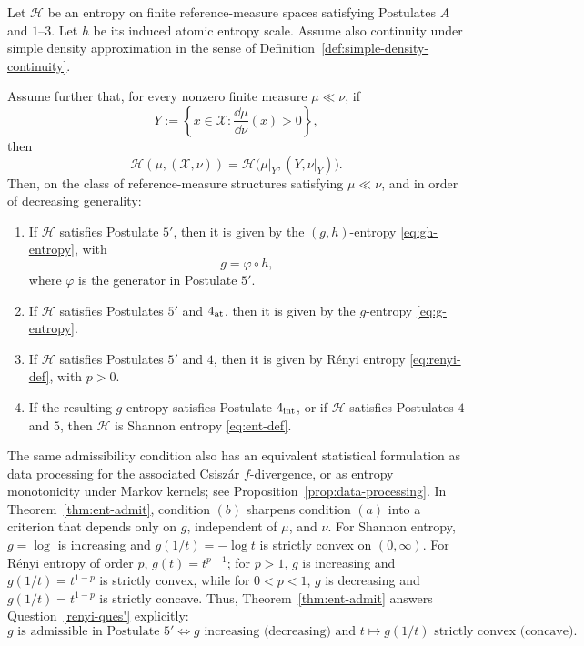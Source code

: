 \documentclass[reqno]{amsart}
\begin{document}
\begin{thm}
\label{thm:ent-char}
Let $\mathcal H$ be an entropy on finite reference-measure spaces
satisfying Postulates $A$ and $1$--$3$. 
Let $h$ be its induced atomic entropy scale. Assume also
continuity under simple density approximation in the sense of
Definition~\ref{def:simple-density-continuity}.

Assume further that, for every nonzero finite measure $\mu\ll\nu$, if
$$
Y
:=
\left\{
x\in\mathcal X:
\frac{\dd\mu}{\dd\nu}(x)>0
\right\},
$$
then
$$
\mathcal H(\mu,(\mathcal X,\nu))
=
\mathcal H
\bigl(
\mu|_Y,(Y,\nu|_Y)
\bigr).
$$
Then, on the class of reference-measure structures satisfying
$\mu\ll\nu$, and in order of decreasing generality:
\begin{enumerate}
\item If $\mathcal H$ satisfies Postulate $5'$, then it is given by the
$(g,h)$-entropy \eqref{eq:gh-entropy}, with
$$
g=\varphi\circ h,
$$
where $\varphi$ is the generator in Postulate $5'$.

\item If $\mathcal{H}$ satisfies Postulates $5'$ and $4_{\rm at}$, then it is
given by the $g$-entropy \eqref{eq:g-entropy}.

\item If $\mathcal H$ satisfies Postulates $5'$ and $4$, then it is given by
R\'enyi entropy \eqref{eq:renyi-def}, with $p>0$.

\item If the resulting $g$-entropy satisfies Postulate $4_{\rm int}$, or if
$\mathcal H$ satisfies Postulates $4$ and $5$, then $\mathcal H$ is Shannon
entropy \eqref{eq:ent-def}.
\end{enumerate}
\end{thm}




\begin{remark}
The same admissibility condition also has an equivalent statistical
formulation as data processing for the associated Csisz\'ar $f$-divergence, or as entropy monotonicity under Markov kernels; see Proposition~\ref{prop:data-processing}.
In Theorem~\ref{thm:ent-admit}, condition $(b)$ sharpens condition $(a)$
into a criterion that depends only on $g$, independent of $\mu$, and $\nu$. For Shannon
entropy, $g=\log$ is increasing and $g(1/t)=-\log t$ is strictly convex on $(0,\infty)$. For R\'enyi entropy of order $p$, $g(t)=t^{p-1}$;
for $p>1$, $g$ is increasing and $g(1/t)=t^{1-p}$ is strictly convex,
while for $0<p<1$, $g$ is decreasing and $g(1/t)=t^{1-p}$ is strictly
concave. Thus, Theorem~\ref{thm:ent-admit} answers Question~\ref{renyi-ques'}
explicitly:
$$
   g \text{ is admissible in Postulate~5}'
  \iff
    g \text{ increasing (decreasing) and } t\mapsto g(1/t) \text{ strictly convex (concave)}.
$$
\end{remark}
\end{document}
